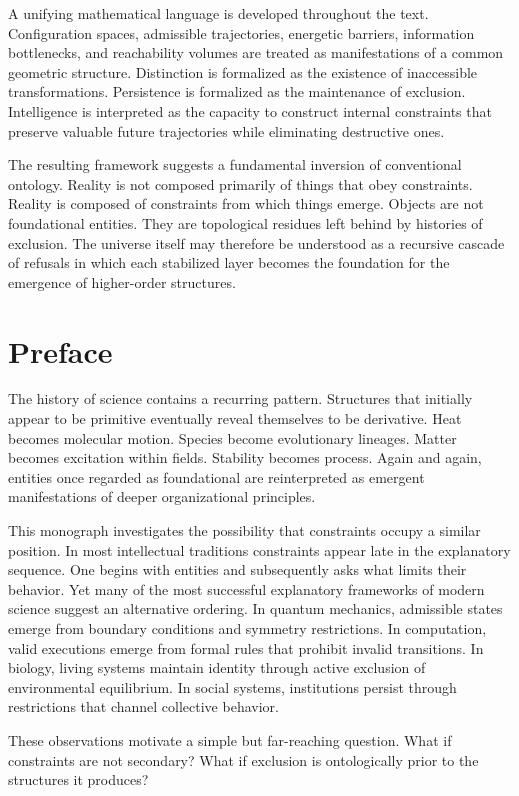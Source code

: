 \documentclass[11pt,oneside]{book}
\theoremstyle{plain}
\theoremstyle{definition}
\theoremstyle{remark}
\begin{document}
A unifying mathematical language is developed throughout the text. Configuration spaces, admissible trajectories, energetic barriers, information bottlenecks, and reachability volumes are treated as manifestations of a common geometric structure. Distinction is formalized as the existence of inaccessible transformations. Persistence is formalized as the maintenance of exclusion. Intelligence is interpreted as the capacity to construct internal constraints that preserve valuable future trajectories while eliminating destructive ones.

The resulting framework suggests a fundamental inversion of conventional ontology. Reality is not composed primarily of things that obey constraints. Reality is composed of constraints from which things emerge. Objects are not foundational entities. They are topological residues left behind by histories of exclusion. The universe itself may therefore be understood as a recursive cascade of refusals in which each stabilized layer becomes the foundation for the emergence of higher-order structures.

\chapter*{Preface}

The history of science contains a recurring pattern. Structures that initially appear to be primitive eventually reveal themselves to be derivative. Heat becomes molecular motion. Species become evolutionary lineages. Matter becomes excitation within fields. Stability becomes process. Again and again, entities once regarded as foundational are reinterpreted as emergent manifestations of deeper organizational principles.

This monograph investigates the possibility that constraints occupy a similar position. In most intellectual traditions constraints appear late in the explanatory sequence. One begins with entities and subsequently asks what limits their behavior. Yet many of the most successful explanatory frameworks of modern science suggest an alternative ordering. In quantum mechanics, admissible states emerge from boundary conditions and symmetry restrictions. In computation, valid executions emerge from formal rules that prohibit invalid transitions. In biology, living systems maintain identity through active exclusion of environmental equilibrium. In social systems, institutions persist through restrictions that channel collective behavior.

These observations motivate a simple but far-reaching question. What if constraints are not secondary? What if exclusion is ontologically prior to the structures it produces?
\end{document}
